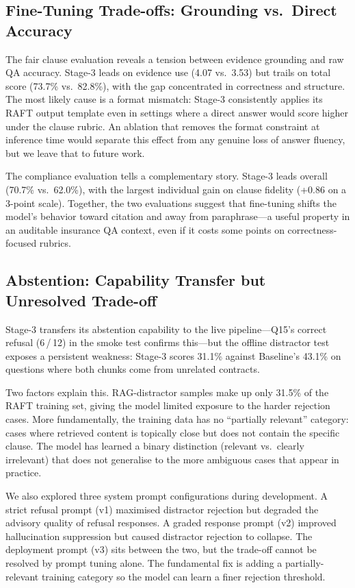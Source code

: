 \subsection{Fine-Tuning Trade-offs: Grounding vs.\ Direct Accuracy}

The fair clause evaluation reveals a tension between evidence grounding and
raw QA accuracy.
Stage-3 leads on evidence use (4.07 vs.\ 3.53) but trails on total score
(73.7\% vs.\ 82.8\%), with the gap concentrated in correctness and structure.
The most likely cause is a format mismatch: Stage-3 consistently applies its
RAFT output template even in settings where a direct answer would score higher
under the clause rubric.
An ablation that removes the format constraint at inference time would separate
this effect from any genuine loss of answer fluency, but we leave that to
future work.

The compliance evaluation tells a complementary story.
Stage-3 leads overall (70.7\% vs.\ 62.0\%), with the largest individual gain
on clause fidelity (+0.86 on a 3-point scale).
Together, the two evaluations suggest that fine-tuning shifts the model's
behavior toward citation and away from paraphrase---a useful property in
an auditable insurance QA context, even if it costs some points on
correctness-focused rubrics.

\subsection{Abstention: Capability Transfer but Unresolved Trade-off}

Stage-3 transfers its abstention capability to the live pipeline---Q15's
correct refusal (6\,/\,12) in the smoke test confirms this---but the offline
distractor test exposes a persistent weakness: Stage-3 scores 31.1\% against
Baseline's 43.1\% on questions where both chunks come from unrelated contracts.

Two factors explain this.
RAG-distractor samples make up only 31.5\% of the RAFT training set, giving
the model limited exposure to the harder rejection cases.
More fundamentally, the training data has no ``partially relevant'' category:
cases where retrieved content is topically close but does not contain the
specific clause.
The model has learned a binary distinction (relevant vs.\ clearly irrelevant)
that does not generalise to the more ambiguous cases that appear in practice.

We also explored three system prompt configurations during development.
A strict refusal prompt (v1) maximised distractor rejection but degraded
the advisory quality of refusal responses.
A graded response prompt (v2) improved hallucination suppression but caused
distractor rejection to collapse.
The deployment prompt (v3) sits between the two, but the trade-off cannot be
resolved by prompt tuning alone.
The fundamental fix is adding a partially-relevant training category so
the model can learn a finer rejection threshold.


